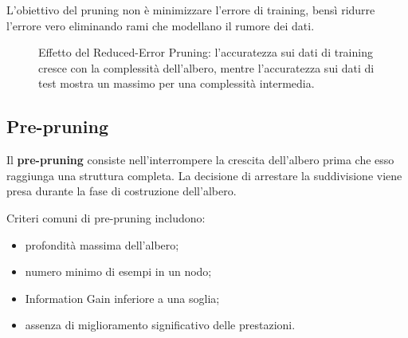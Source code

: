 \documentclass[a4paper,12pt]{report}
\begin{document}
L’obiettivo del pruning non è minimizzare l’errore di training, bensì ridurre l’errore vero eliminando rami che modellano il rumore dei dati.

\begin{figure}[H]
\centering
{}
\caption{Effetto del Reduced-Error Pruning: l’accuratezza sui dati di training cresce con la complessità dell’albero, mentre l’accuratezza sui dati di test mostra un massimo per una complessità intermedia.}
\end{figure}

\subsection{Pre-pruning}

Il \textbf{pre-pruning} consiste nell’interrompere la crescita dell’albero prima che esso raggiunga una struttura completa.
La decisione di arrestare la suddivisione viene presa durante la fase di costruzione dell’albero.

Criteri comuni di pre-pruning includono:
\begin{itemize}
    \item profondità massima dell’albero;
    \item numero minimo di esempi in un nodo;
    \item Information Gain inferiore a una soglia;
    \item assenza di miglioramento significativo delle prestazioni.
\end{itemize}
\end{document}
